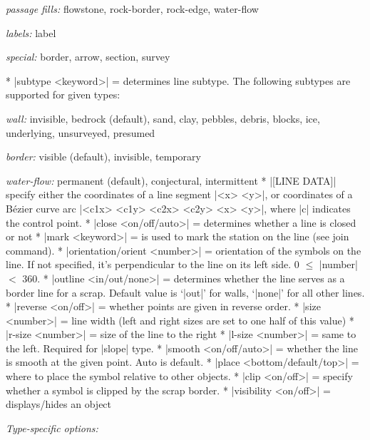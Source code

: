      {\it passage fills:} flowstone, rock-border, rock-edge, water-flow
     
     {\it labels:} label

     {\it special:} border, arrow, section, survey
\endarguments


\comopt
       * |subtype <keyword>| = determines line subtype. The following
         subtypes are supported for given types:  

         {\it wall:} invisible, bedrock (default), sand, clay, pebbles, debris,
         blocks, ice, underlying, unsurveyed, presumed  

         {\it border:} visible (default), invisible, temporary
         
         {\it water-flow:} permanent (default), conjectural, intermittent
       * |[LINE DATA]| specify either the coordinates of a line segment
         |<x> <y>|, or coordinates of a B\'ezier curve arc 
         |<c1x> <c1y> <c2x> <c2y> <x> <y>|, where |c| indicates the control
         point.
       * |close <on/off/auto>| = determines whether a line is closed 
         or not
       * |mark <keyword>| = is used to mark the station on the line (see
         join command).
       * |orientation/orient <number>| = orientation of the symbols
         on the line. If not specified, it's perpendicular to the 
         line on its left side. 0 $\le$ |number| $<$ 360.
       * |outline <in/out/none>| = determines whether the line serves as
         a border line for a scrap. Default value is `|out|' for
         walls, `|none|' for all other lines.
       * |reverse <on/off>| = whether points are given in reverse order.
       * |size <number>| = line width (left and right sizes are set to 
         one half of this value)
       * |r-size <number>| = size of the line to the right
       * |l-size <number>| = same to the left. Required for |slope| type.
       * |smooth <on/off/auto>| = whether the line is smooth at the given point.
         Auto is default.
       * |place <bottom/default/top>| = where to place the symbol relative
         to other objects.
       * |clip <on/off>| = specify whether a symbol is clipped by the scrap border.
       * |visibility <on/off>| = displays/hides an object

    {\it Type-specific options:}\Nobreak

